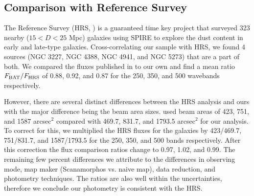 \subsection{Comparison with \herschel{} Reference Survey}
The \herschel{} Reference Survey (HRS, \citet{Boselli:2010fj}) is a guaranteed time key project that surveyed 323 nearby ($15<D<25$ Mpc) galaxies using SPIRE to explore the dust content in early and late-type galaxies. Cross-correlating our sample with HRS, we found 4 sources (NGC 3227, NGC 4388, NGC 4941, and NGC 5273) that are a part of both. We compared the fluxes published in \citet{Ciesla:2012lq} to our own and find a mean ratio $F_{\rm{BAT}}/F_{\rm{HRS}}$ of 0.88, 0.92, and 0.87 for the 250, 350, and 500 \um{} wavebands respectively. 

However, there are several distinct differences between the HRS analysis and ours with the major difference being the beam area sizes. \citet{Ciesla:2012lq} used beam areas of 423, 751, and 1587 arcsec$^{2}$ compared with 469.7, 831.7, and 1793.5 arcsec$^{2}$ for our analysis. To correct for this, we multiplied the HRS fluxes for the galaxies by 423/469.7, 751/831.7, and 1587/1793.5 for the 250, 350, and 500 \um{} bands respectively.  After this correction the flux comparison ratios change to 0.97, 1.02, and 0.99. The remaining few percent differences we attribute to the differences in observing mode, map maker (Scanamorphos vs. naive map), data reduction, and photometry techniques. The ratios are also well within the uncertainties, therefore we conclude our photometry is consistent with the HRS.
  
